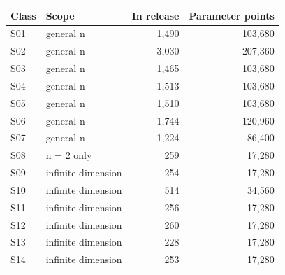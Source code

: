 \documentclass[11pt]{article}
\begin{document}
\begin{center}
\small
\begin{tabular}{llrr}
\toprule
Class & Scope & In release & Parameter points \\
\midrule
S01 & general n & 1,490 & 103,680 \\
S02 & general n & 3,030 & 207,360 \\
S03 & general n & 1,465 & 103,680 \\
S04 & general n & 1,513 & 103,680 \\
S05 & general n & 1,510 & 103,680 \\
S06 & general n & 1,744 & 120,960 \\
S07 & general n & 1,224 & 86,400 \\
S08 & n = 2 only & 259 & 17,280 \\
S09 & infinite dimension & 254 & 17,280 \\
S10 & infinite dimension & 514 & 34,560 \\
S11 & infinite dimension & 256 & 17,280 \\
S12 & infinite dimension & 260 & 17,280 \\
S13 & infinite dimension & 228 & 17,280 \\
S14 & infinite dimension & 253 & 17,280 \\
\bottomrule
\end{tabular}
\end{center}
\end{document}
